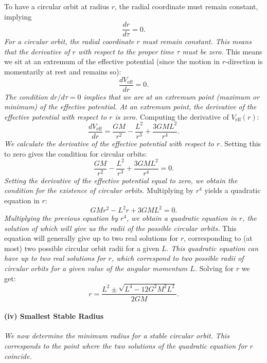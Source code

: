 \documentclass{article}
\begin{document}
To have a circular orbit at radius \(r\), the radial coordinate must remain constant, implying
\begin{equation*}
\frac{dr}{d\tau} = 0.
\end{equation*}
\textit{For a circular orbit, the radial coordinate $r$ must remain constant. This means that the derivative of $r$ with respect to the proper time $\tau$ must be zero.}
This means we sit at an extremum of the effective potential (since the motion in $r$-direction is momentarily at rest and remains so):
\begin{equation*}
\frac{dV_{\mathrm{eff}}}{dr} = 0.
\end{equation*}
\textit{The condition $dr/d\tau = 0$ implies that we are at an extremum point (maximum or minimum) of the effective potential. At an extremum point, the derivative of the effective potential with respect to $r$ is zero.}
Computing the derivative of $V_{\mathrm{eff}}(r)$:
\begin{equation*}
\frac{dV_{\mathrm{eff}}}{dr} = \frac{GM}{r^2} - \frac{L^2}{r^3} + \frac{3 G M L^2}{r^4}.
\end{equation*}
\textit{We calculate the derivative of the effective potential with respect to $r$.}
Setting this to zero gives the condition for circular orbits:
\begin{equation*}
\frac{GM}{r^2} - \frac{L^2}{r^3} + \frac{3 G M L^2}{r^4} = 0.
\end{equation*}
\textit{Setting the derivative of the effective potential equal to zero, we obtain the condition for the existence of circular orbits.}
Multiplying by $r^4$ yields a quadratic equation in $r$:
\begin{equation*}
GM r^2 - L^2 r + 3 G M L^2 = 0.
\end{equation*}
\textit{Multiplying the previous equation by $r^4$, we obtain a quadratic equation in $r$, the solution of which will give us the radii of the possible circular orbits.}
This equation will generally give up to two real solutions for $r$, corresponding to (at most) two possible circular orbit radii for a given $L$.
\textit{This quadratic equation can have up to two real solutions for $r$, which correspond to two possible radii of circular orbits for a given value of the angular momentum $L$.} Solving for $r$ we get:
\begin{equation*}
r = \frac{L^2 \pm \sqrt{L^4 - 12 G^2 M^2 L^2}}{2 G M}.
\end{equation*}
\paragraph{(iv) Smallest Stable Radius}
\textit{We now determine the minimum radius for a stable circular orbit. This corresponds to the point where the two solutions of the quadratic equation for $r$ coincide.}
\end{document}
